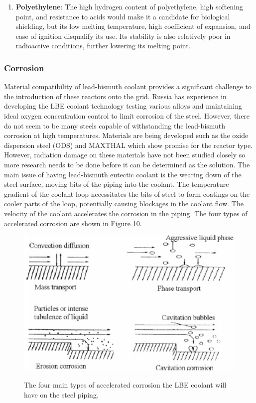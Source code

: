 \documentclass[12pt]{article}
\begin{document}
\begin{enumerate}
\item \textbf{Polyethylene}: \newline
The high hydrogen content of polyethylene, high softening point, and resistance to acids would 	
make it a candidate for biological shielding, but its low melting temperature, high coefficient of expansion, and ease of ignition disqualify its use.  Its stability is also relatively poor in radioactive conditions, further lowering its melting point.  


\end{enumerate}

\subsubsection{Corrosion}
Material compatibility of lead-bismuth coolant provides a significant challenge to the introduction of these reactors onto the grid.  Russia has experience in developing the LBE coolant technology testing various alloys and maintaining ideal oxygen concentration control to limit corrosion of the steel.  However, there do not seem to be many steels capable of withstanding the lead-bismuth corrosion at high temperatures.  Materials are being developed such as the oxide dispersion steel (ODS) and MAXTHAL which show promise for the reactor type.  However, radiation damage on these materials have not been studied closely so more research needs to be done before it can be determined as the solution.  \newline
The main issue of having lead-bismuth eutectic coolant is the wearing down of the steel surface, moving bits of the piping into the coolant.  The temperature gradient of the coolant loop necessitates the bits of steel to form coatings on the cooler parts of the loop, potentially causing blockages in the coolant flow.  The velocity of the coolant accelerates the corrosion in the piping.  The four types of accelerated corrosion are shown in Figure 10.

\begin{figure}[H]                                  
    \centering                                     
    \includegraphics[width=1\textwidth]{corrosion-types}   
    \caption{The four main types of accelerated corrosion the LBE coolant will have on the steel piping.} \cite{Corrosion_LBE}
    \label{fig:mesh1}     
\end{figure}  
\end{document}
